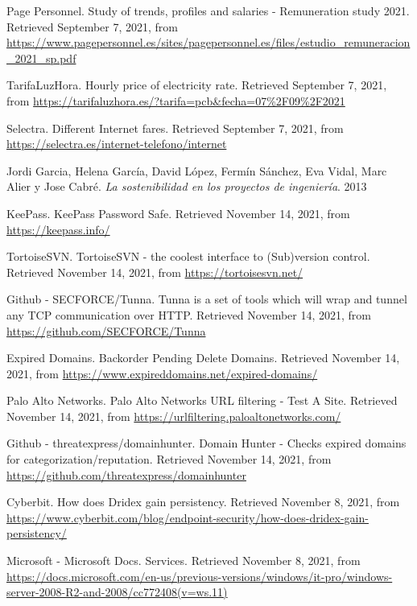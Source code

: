 \begin{thebibliography}{99}
Page Personnel. 
Study of trends, profiles and salaries - Remuneration study 2021. 
Retrieved September 7, 2021, from \url{https://www.pagepersonnel.es/sites/pagepersonnel.es/files/estudio_remuneracion_2021_sp.pdf}

TarifaLuzHora. 
Hourly price of electricity rate. 
Retrieved September 7, 2021, from \url{https://tarifaluzhora.es/?tarifa=pcb&fecha=07\%2F09\%2F2021}

Selectra. 
Different Internet fares. 
Retrieved September 7, 2021, from \url{https://selectra.es/internet-telefono/internet}

Jordi Garcia, Helena García, David López, Fermín Sánchez, Eva Vidal, Marc Alier y Jose Cabré. 
\emph{La sostenibilidad en los proyectos de ingeniería}. 
2013

KeePass.
KeePass Password Safe.
Retrieved November 14, 2021, from \url{https://keepass.info/}

TortoiseSVN.
TortoiseSVN - the coolest interface to (Sub)version control.
Retrieved November 14, 2021, from \url{https://tortoisesvn.net/}

Github - SECFORCE/Tunna.
Tunna is a set of tools which will wrap and tunnel any TCP communication over HTTP.
Retrieved November 14, 2021, from \url{https://github.com/SECFORCE/Tunna}

Expired Domains.
Backorder Pending Delete Domains.
Retrieved November 14, 2021, from \url{https://www.expireddomains.net/expired-domains/}

Palo Alto Networks.
Palo Alto Networks URL filtering - Test A Site.
Retrieved November 14, 2021, from \url{https://urlfiltering.paloaltonetworks.com/}

Github - threatexpress/domainhunter.
Domain Hunter - Checks expired domains for categorization/reputation.
Retrieved November 14, 2021, from \url{https://github.com/threatexpress/domainhunter}

Cyberbit.
How does Dridex gain persistency.
Retrieved November 8, 2021, from \url{https://www.cyberbit.com/blog/endpoint-security/how-does-dridex-gain-persistency/}

Microsoft - Microsoft Docs.
Services.
Retrieved November 8, 2021, from \url{https://docs.microsoft.com/en-us/previous-versions/windows/it-pro/windows-server-2008-R2-and-2008/cc772408(v=ws.11)}


\end{thebibliography}
